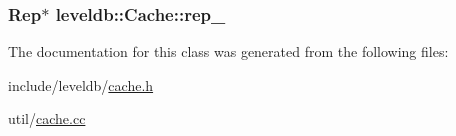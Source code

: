 \subsubsection[{rep\+\_\+}]{\setlength{\rightskip}{0pt plus 5cm}Rep$\ast$ leveldb\+::\+Cache\+::rep\+\_\+\hspace{0.3cm}{\ttfamily [private]}}\label{classleveldb_1_1_cache_aceb7389e9fbb571dcab109d4824e9960}


The documentation for this class was generated from the following files\+:\begin{DoxyCompactItemize}
\item 
include/leveldb/\hyperlink{cache_8h}{cache.\+h}\item 
util/\hyperlink{cache_8cc}{cache.\+cc}\end{DoxyCompactItemize}
